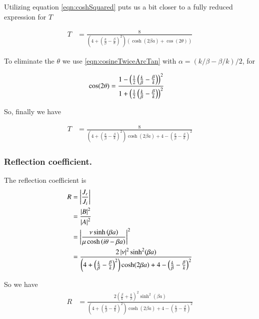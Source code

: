 \documentclass{article}
\begin{document}
Utilizing equation \ref{eqn:coshSquared}
puts us a bit closer to a fully reduced expression for $T$

\begin{align*}
T 
&= \frac{8} { 
\left(4 + \left( \frac{k}{\beta} -\frac{\beta}{k} \right)^2 \right)
\left( \cosh(2\beta a) + \cos(2\theta) \right)
}
\end{align*}

To eliminate the $\theta$ we use \ref{eqn:cosineTwiceArcTan}
with $\alpha = ({k}/{\beta} - {\beta}/{k} )/2$, for

\begin{align*}
\cos(2\theta) 
&= 
\frac{ 1 - \left(\frac{1}{2} \left(\frac{k}{\beta} - \frac{\beta}{k} \right)\right)^2 }
{1 + \left(\frac{1}{2} \left(\frac{k}{\beta} - \frac{\beta}{k} \right)\right)^2}
\end{align*}

So, finally we have

\begin{align}\label{eqn:Tcoeff1}
T 
&= \frac{8} { 
\left(4 + \left( \frac{k}{\beta} -\frac{\beta}{k} \right)^2 \right)
\cosh(2\beta a)
+ 
4 - \left(\frac{k}{\beta} - \frac{\beta}{k} \right)^2 
}
\end{align}

\subsubsection{ Reflection coefficient. }

The reflection coefficient is
\begin{align*}
R 
&= \left\lvert{\frac{J_r}{J_i}}\right\rvert \\
&= \frac{\left\lvert{B}\right\rvert^2}{\left\lvert{A}\right\rvert^2} \\
&= 
\left\lvert{\frac{\nu \sinh\left( \beta a \right) }
{\mu \cosh\left( i\theta -\beta a \right) }}\right\rvert^2 \\
&= \frac{2 \left\lvert{\nu}\right\rvert^2 \sinh^2( \beta a)} { 
\left(4 + \left( \frac{k}{\beta} -\frac{\beta}{k} \right)^2 \right)
\cosh(2\beta a)
+ 
4 - \left(\frac{k}{\beta} - \frac{\beta}{k} \right)^2 
}
\end{align*}

So we have
\begin{align}\label{eqn:Rcoeff1}
R 
&= \frac{2 
\left(\frac{\beta}{k} + \frac{k}{\beta} \right)^2 
\sinh^2( \beta a)} { 
\left(4 + \left( \frac{k}{\beta} -\frac{\beta}{k} \right)^2 \right)
\cosh(2\beta a)
+ 
4 - \left(\frac{k}{\beta} - \frac{\beta}{k} \right)^2 
}
\end{align}
\end{document}
